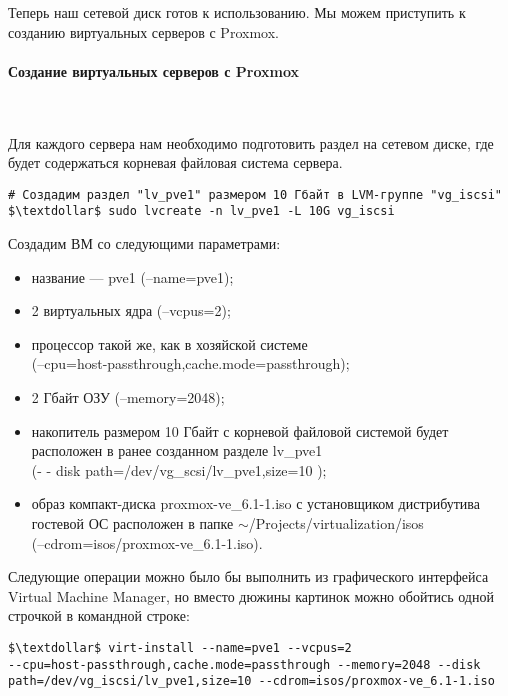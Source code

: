 \documentclass[14pt, a4paper]{article}
\begin{document}
Теперь наш сетевой диск готов к использованию. Мы можем приступить к созданию виртуальных
серверов с Proxmox.

\paragraph*{Создание виртуальных серверов с Proxmox} \mbox{}\\

\noindent Для каждого сервера нам необходимо подготовить раздел на сетевом диске, где будет содержаться
корневая файловая система сервера.
\newpage
\begin{lstlisting}
# Создадим раздел "lv_pve1" размером 10 Гбайт в LVM-группе "vg_iscsi"
$\textdollar$ sudo lvcreate -n lv_pve1 -L 10G vg_iscsi
\end{lstlisting}
\vspace{0.2cm}

\noindent Создадим ВМ со следующими параметрами:
\begin{itemize}
    \item название — pve1 (--name=pve1);
    \item 2 виртуальных ядра (--vcpus=2);
    \item процессор такой же, как в хозяйской системе\\
    (--cpu=host-passthrough,cache.mode=passthrough);
    \item 2 Гбайт ОЗУ (--memory=2048);
    \item накопитель размером 10 Гбайт с корневой файловой системой будет расположен в ранее
    созданном разделе lv\_pve1 \\ (- - disk path=/dev/vg\_scsi/lv\_pve1,size=10 );
    \item образ компакт-диска proxmox-ve\_6.1-1.iso с установщиком дистрибутива гостевой ОС
    расположен в папке $\mathtt{\sim}$/Projects/virtualization/isos \\
    (--cdrom=isos/proxmox-ve\_6.1-1.iso).
\end{itemize}
\vspace{0.3cm}

Следующие операции можно было бы выполнить из графического интерфейса Virtual Machine
Manager, но вместо дюжины картинок можно обойтись одной строчкой в командной строке:
\vspace{0.3cm}
\begin{lstlisting}
$\textdollar$ virt-install --name=pve1 --vcpus=2
--cpu=host-passthrough,cache.mode=passthrough --memory=2048 --disk
path=/dev/vg_iscsi/lv_pve1,size=10 --cdrom=isos/proxmox-ve_6.1-1.iso   
\end{lstlisting}
\vspace{0.2cm}
\end{document}
